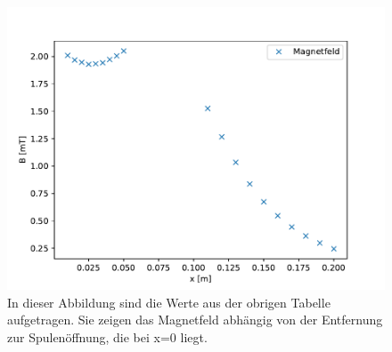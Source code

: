 \documentclass[titlepage = firstcover]{scrartcl}
\begin{document}
                \begin{figure}[h]
                    \centering
                    \includegraphics{HelmholtzA.pdf}
                    \caption{In dieser Abbildung sind die Werte aus der obrigen Tabelle aufgetragen. Sie zeigen das Magnetfeld abhängig von der Entfernung zur Spulenöffnung, die bei x=0 liegt.}
                    \label{fig:HelmholtzA}
    
                \end{figure}
    
                \FloatBarrier
                \newpage
    
\end{document}
